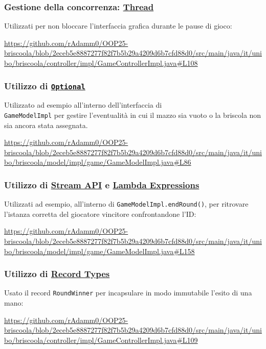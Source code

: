 \documentclass[a4paper,12pt]{report}
\begin{document}
\subsubsection*{\textbf{Gestione della concorrenza: \href{https://docs.oracle.com/javase/8/docs/api/java/lang/Thread.html}{Thread}}}
Utilizzati per non bloccare l'interfaccia grafica durante le pause di gioco:
\begin{sloppypar}
    \raggedright
    \url{https://github.com/rAdamm0/OOP25-briscoola/blob/2eceb5e8887277f82f7b5b29a4209d6b7cfd88d0/src/main/java/it/unibo/briscoola/controller/impl/GameControllerImpl.java#L108}
\end{sloppypar}

\subsubsection{\textbf{Utilizzo di \href{https://docs.oracle.com/javase/8/docs/api/java/util/Optional.html}{\texttt{Optional}}}}
Utilizzato ad esempio all'interno dell'interfaccia di \\\texttt{GameModelImpl} per gestire l'eventualità in cui il mazzo sia vuoto o la briscola non sia ancora stata assegnata.
\begin{sloppypar}
    \raggedright
    \url{https://github.com/rAdamm0/OOP25-briscoola/blob/2eceb5e8887277f82f7b5b29a4209d6b7cfd88d0/src/main/java/it/unibo/briscoola/model/impl/game/GameModelImpl.java#L86}
\end{sloppypar}

\subsubsection*{\textbf{Utilizzo di \href{https://docs.oracle.com/javase/tutorial/collections/streams/index.html}{Stream API} e \href{https://docs.oracle.com/javase/tutorial/java/javaOO/lambdaexpressions.html}{Lambda Expressions}}}
Utilizzati ad esempio, all'interno di \texttt{GameModelImpl.endRound()}, per ritrovare l'istanza corretta del giocatore vincitore confrontandone l'ID:
\begin{sloppypar}
    \url{https://github.com/rAdamm0/OOP25-briscoola/blob/2eceb5e8887277f82f7b5b29a4209d6b7cfd88d0/src/main/java/it/unibo/briscoola/model/impl/game/GameModelImpl.java#L158} 
\end{sloppypar}

\subsubsection*{\textbf{Utilizzo di \href{https://docs.oracle.com/en/java/javase/17/docs/api/java.base/java/lang/Record.html}{Record Types}}}
Usato il record \texttt{RoundWinner} per incapsulare in modo immutabile l'esito di una mano:
\begin{sloppypar}
    \url{https://github.com/rAdamm0/OOP25-briscoola/blob/2eceb5e8887277f82f7b5b29a4209d6b7cfd88d0/src/main/java/it/unibo/briscoola/controller/impl/GameControllerImpl.java#L109} 
\end{sloppypar}
\end{document}
